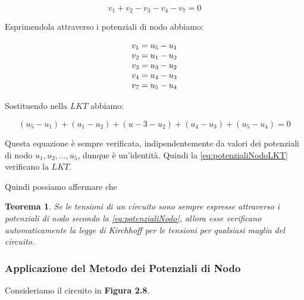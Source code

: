 \documentclass[a4paper]{report}
\newtheorem{definizione}{Teorema}
\begin{document}
\[
v_1+v_2-v_3-v_4-v_7=0
\]

Esprimendola attraverso i potenziali di nodo abbiamo:

\begin{equation}\label{eq:potenzialiNodoLKT}
  \begin{array}{l l l l l}
    v_1=u_5-u_1\\
    v_2=u_1-u_2\\
    v_3=u_3-u_2\\
    v_4=u_4-u_3\\
    v_7=u_5-u_4
  \end{array}
\end{equation}

Sostituendo nella $LKT$ abbiamo:

\[
(u_5-u_1)+(u_1-u_2)+(u-3-u_2)+(u_4-u_3)+(u_5-u_4)=0
\]

Questa equazione \`e sempre verificata, indipendentemente da valori
dei potenziali di nodo $u_1, u_2,..., u_5$, dunque \`e
un'identit\`a. Quindi la \ref{eq:potenzialiNodoLKT} verificano la $LKT$.

Quindi possiamo affermare che

\begin{definizione}
  Se le tensioni di un circuito sono sempre espresse attraverso i
  potenziali di nodo secondo la \ref{eq:potenzialiNodo}, allora esse
  verificano automaticamente la legge di Kirchhoff per le tensioni per
  qualsiasi maglia del circuito.
\end{definizione}

\subsubsection{Applicazione del Metodo dei Potenziali di Nodo}

Consideriamo il circuito in {\bf Figura 2.8}.
\end{document}
